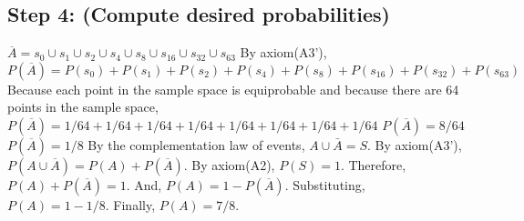 \documentclass[a4paper,10pt]{article}
\begin{document}
\subsection{Step 4: (Compute desired probabilities)}
$ \overline{A} = s_{0} \cup s_{1} \cup s_{2} \cup s_{4} \cup s_{8} \cup s_{16} \cup s_{32} \cup s_{63} $ \newline
By axiom(A3'), \newline
$ P(\overline{A}) = P(s_{0}) + P(s_{1}) + P(s_{2}) + P(s_{4}) + P(s_{8}) + P(s_{16}) + P(s_{32}) + P(s_{63}) $ 
\newline
Because each point in the sample space is equiprobable and because there are 64 points in the sample space, \newline
$ P(\overline{A}) = 1/64 + 1/64 + 1/64 + 1/64 + 1/64 + 1/64 + 1/64 + 1/64 $ \newline
$ P(\overline{A}) = 8/64 $ \newline
$ P(\overline{A}) = 1/8 $ \newline
By the complementation law of events, $ A \cup \bar{A} = S. $ \newline
By axiom(A3'), $ P(A \cup \overline{A}) = P(A) + P(\overline{A}). $ \newline
By axiom(A2), $ P(S) = 1. $ \newline
Therefore, $ P(A) + P(\overline{A}) = 1. $ \newline
And, $ P(A) = 1 - P(\overline{A}). $ \newline
Substituting, $ P(A) = 1 - 1/8. $ \newline
Finally, $ P(A) = 7/8. $ \newline 
\end{document}
